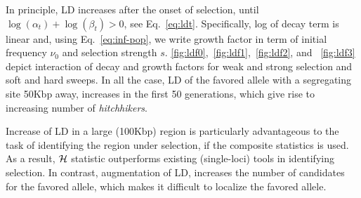 In principle, LD increases after the onset of selection, until $\log(\alpha_t) 
+\log(\beta_t) 
>0$, see Eq.~\ref{eq:ldt}. 
Specifically, log of decay term is linear and, using 
Eq.~\ref{eq:inf-pop}, we write growth 
factor in term of initial frequency $\nu_0$ and selection strength $s$. 
\ref{fig:ldf0},~\ref{fig:ldf1},~\ref{fig:ldf2}, and ~\ref{fig:ldf3} 
depict interaction of 
decay and growth factors for weak and 
strong selection and soft and hard sweeps. In all the case, LD of the 
favored allele with a segregating site 50Kbp away, increases in the first 50 
generations, which give rise to increasing number of \emph{hitchhikers}. 

Increase of LD in a large (100Kbp) region is particularly advantageous to the 
task of identifying the region under selection, if the composite statistics is 
used. As a result, ${\cal H}$ statistic outperforms existing (single-loci) tools in 
identifying selection. In contrast, augmentation of LD, increases the 
number 
of candidates for 
the favored allele, which makes it difficult to localize the favored 
allele.
